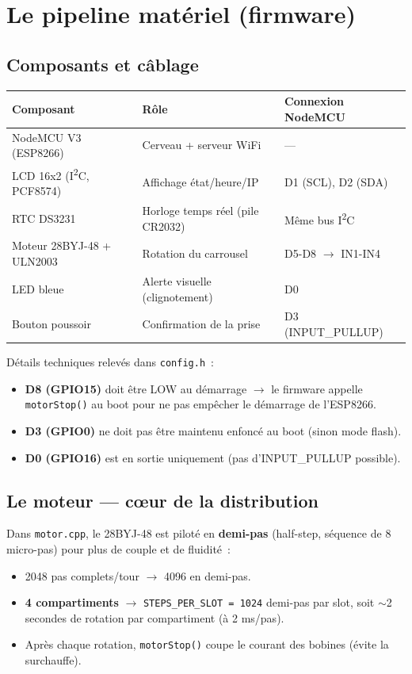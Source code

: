 \documentclass[11pt,a4paper]{article}
\begin{document}
\section{Le pipeline mat\'eriel (firmware)}

\subsection{Composants et c\^ablage}

\begin{tabularx}{\linewidth}{L{3.4cm} X L{3.6cm}}
\toprule
{}\textbf{Composant} & \textbf{R\^ole} & \textbf{Connexion NodeMCU} \\
\midrule
NodeMCU V3 (ESP8266) & Cerveau + serveur WiFi & --- \\
LCD 16x2 (I\textsuperscript{2}C, PCF8574) & Affichage \'etat/heure/IP & D1 (SCL), D2 (SDA) \\
RTC DS3231 & Horloge temps r\'eel (pile CR2032) & M\^eme bus I\textsuperscript{2}C \\
Moteur 28BYJ-48 + ULN2003 & Rotation du carrousel & D5-D8 $\rightarrow$ IN1-IN4 \\
LED bleue & Alerte visuelle (clignotement) & D0 \\
Bouton poussoir & Confirmation de la prise & D3 (INPUT\_PULLUP) \\
\bottomrule
\end{tabularx}

\vspace{6pt}
D\'etails techniques relev\'es dans \texttt{config.h}~:
\begin{itemize}
  \item \textbf{D8 (GPIO15)} doit \^etre LOW au d\'emarrage $\rightarrow$ le firmware
        appelle \texttt{motorStop()} au boot pour ne pas emp\^echer le d\'emarrage de l'ESP8266.
  \item \textbf{D3 (GPIO0)} ne doit pas \^etre maintenu enfonc\'e au boot (sinon mode flash).
  \item \textbf{D0 (GPIO16)} est en sortie uniquement (pas d'INPUT\_PULLUP possible).
\end{itemize}

\subsection{Le moteur --- c\oe ur de la distribution}

Dans \texttt{motor.cpp}, le 28BYJ-48 est pilot\'e en \textbf{demi-pas} (half-step,
s\'equence de 8 micro-pas) pour plus de couple et de fluidit\'e~:
\begin{itemize}
  \item 2048 pas complets/tour $\rightarrow$ 4096 en demi-pas.
  \item \textbf{4 compartiments} $\rightarrow$ \texttt{STEPS\_PER\_SLOT = 1024} demi-pas
        par slot, soit $\sim$2 secondes de rotation par compartiment (\`a 2 ms/pas).
  \item Apr\`es chaque rotation, \texttt{motorStop()} coupe le courant des bobines
        (\'evite la surchauffe).
\end{itemize}
\end{document}
